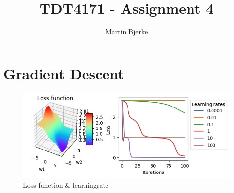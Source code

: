\documentclass{article}
\title{TDT4171 - Assignment 4}
\author{Martin Bjerke}
\begin{document}
\maketitle

\section{Gradient Descent}

\begin{figure}[h]
  \includegraphics[scale=0.7]{plots}
  \caption{Loss function \& learningrate}
  \label{fig:plots}
\end{figure}
\end{document}
